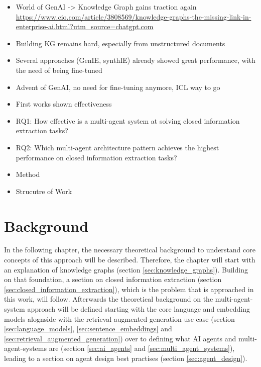 \documentclass[a4paper,oneside,bibliography=totoc]{scrbook}
\begin{document}
\begin{itemize}
  \item World of GenAI -> Knowledge Graph gains traction again \url{https://www.cio.com/article/3808569/knowledge-graphs-the-missing-link-in-enterprise-ai.html?utm_source=chatgpt.com}
  \item Building KG remains hard, especially from unstructured documents \cite{Zhao2024}
  \item Several approaches (GenIE, synthIE) already showed great performance, with the need of being fine-tuned \cite{Josifoski2021,Josifoski2023}
  \item Advent of GenAI, no need for fine-tuning anymore, ICL way to go \cite{Brown2020}
  \item First works shown effectiveness \cite{Shi2024}
  \item RQ1: How effective is a multi-agent system at solving closed information extraction tasks?
  \item RQ2: Which multi-agent architecture pattern achieves the highest performance on closed information extraction tasks?
  \item Method
  \item Strucutre of Work
\end{itemize}

\chapter{Background}
\label{ch:related_work}
In the following chapter, the necessary theoretical background to understand core concepts of this approach will be described. Therefore, the chapter will start with an explanation of knowledge graphs (section \ref{sec:knowledge_graphs}). Building on that foundation, a section on closed information extraction (section \ref{sec:closed_information_extraction}), which is the problem that is approached in this work, will follow. Afterwards the theoretical background on the multi-agent-system approach will be defined starting with the core language and embedding models alognside with the retrieval augmented generation use case (section \ref{sec:language_models}, \ref{sec:sentence_embeddings} and \ref{sec:retrieval_augmented_generation}) over to defining what \ac{AI} agents and multi-agent-systems are (section \ref{sec:ai_agents} and \ref{sec:multi_agent_systems}), leading to a section on agent design best practises (section \ref{sec:agent_design}).
\end{document}
